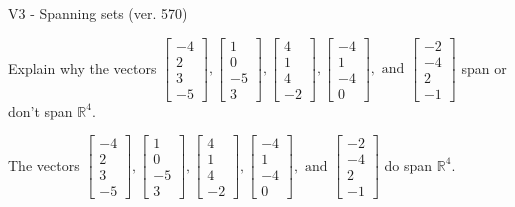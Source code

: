 \begin{exercise}
  \begin{exerciseTitle}V3 - Spanning sets (ver. 570)\end{exerciseTitle}
  \begin{exerciseStatement}
    Explain why the vectors \(\left[\begin{array}{r}
-4 \\
2 \\
3 \\
-5
\end{array}\right] , \left[\begin{array}{r}
1 \\
0 \\
-5 \\
3
\end{array}\right] , \left[\begin{array}{r}
4 \\
1 \\
4 \\
-2
\end{array}\right] , \left[\begin{array}{r}
-4 \\
1 \\
-4 \\
0
\end{array}\right] , \text{ and } \left[\begin{array}{r}
-2 \\
-4 \\
2 \\
-1
\end{array}\right]\) span or don't span \(\mathbb{R}^4\). 
	


  \end{exerciseStatement}
  \begin{exerciseAnswer}
   The vectors \(\left[\begin{array}{r}
-4 \\
2 \\
3 \\
-5
\end{array}\right] , \left[\begin{array}{r}
1 \\
0 \\
-5 \\
3
\end{array}\right] , \left[\begin{array}{r}
4 \\
1 \\
4 \\
-2
\end{array}\right] , \left[\begin{array}{r}
-4 \\
1 \\
-4 \\
0
\end{array}\right] , \text{ and } \left[\begin{array}{r}
-2 \\
-4 \\
2 \\
-1
\end{array}\right]\) 
  	 do  
	span \(\mathbb{R}^4\).
  



\end{exerciseAnswer}
\end{exercise}
